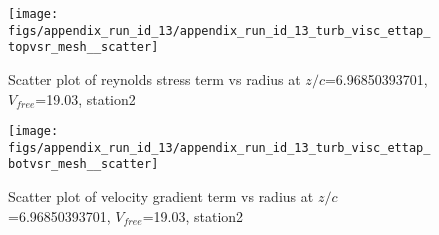 \begin{figure}[H]
\centering
\texttt{[image: figs/appendix\_run\_id\_13/appendix\_run\_id\_13\_turb\_visc\_ettap\_topvsr\_mesh\_\_scatter]}
\caption{Scatter plot of reynolds stress term vs radius at $z/c$=6.96850393701, $V_{free}$=19.03, station2}
\label{fig:appendix_run_id_13_turb_visc_ettap_topvsr_mesh__scatter}
\end{figure}


\begin{figure}[H]
\centering
\texttt{[image: figs/appendix\_run\_id\_13/appendix\_run\_id\_13\_turb\_visc\_ettap\_botvsr\_mesh\_\_scatter]}
\caption{Scatter plot of velocity gradient term vs radius at $z/c$=6.96850393701, $V_{free}$=19.03, station2}
\label{fig:appendix_run_id_13_turb_visc_ettap_botvsr_mesh__scatter}
\end{figure}


